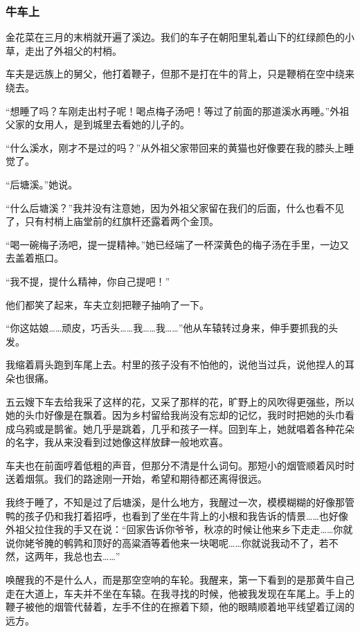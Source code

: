 \subsubsection{牛车上}

\par 金花菜在三月的末梢就开遍了溪边。我们的车子在朝阳里轧着山下的红绿颜色的小草，走出了外祖父的村梢。
\par 车夫是远族上的舅父，他打着鞭子，但那不是打在牛的背上，只是鞭梢在空中绕来绕去。
\par “想睡了吗？车刚走出村子呢！喝点梅子汤吧！等过了前面的那道溪水再睡。”外祖父家的女用人，是到城里去看她的儿子的。
\par “什么溪水，刚才不是过的吗？”从外祖父家带回来的黄猫也好像要在我的膝头上睡觉了。
\par “后塘溪。”她说。
\par “什么后塘溪？”我并没有注意她，因为外祖父家留在我们的后面，什么也看不见了，只有村梢上庙堂前的红旗杆还露着两个金顶。
\par “喝一碗梅子汤吧，提一提精神。”她已经端了一杯深黄色的梅子汤在手里，一边又去盖着瓶口。
\par “我不提，提什么精神，你自己提吧！”
\par 他们都笑了起来，车夫立刻把鞭子抽响了一下。
\par “你这姑娘……顽皮，巧舌头……我……我……”他从车辕转过身来，伸手要抓我的头发。
\par 我缩着肩头跑到车尾上去。村里的孩子没有不怕他的，说他当过兵，说他捏人的耳朵也很痛。
\par 五云嫂下车去给我采了这样的花，又采了那样的花，旷野上的风吹得更强些，所以她的头巾好像是在飘着。因为乡村留给我尚没有忘却的记忆，我时时把她的头巾看成乌鸦或是鹊雀。她几乎是跳着，几乎和孩子一样。回到车上，她就唱着各种花朵的名字，我从来没看到过她像这样放肆一般地欢喜。
\par 车夫也在前面哼着低粗的声音，但那分不清是什么词句。那短小的烟管顺着风时时送着烟氛。我们的路途刚一开始，希望和期待都还离得很远。
\par 我终于睡了，不知是过了后塘溪，是什么地方，我醒过一次，模模糊糊的好像那管鸭的孩子仍和我打着招呼，也看到了坐在牛背上的小根和我告诉的情景……也好像外祖父拉住我的手又在说：“回家告诉你爷爷，秋凉的时候让他来乡下走走……你就说你姥爷腌的鹌鹑和顶好的高粱酒等着他来一块喝呢……你就说我动不了，若不然，这两年，我总也去……”
\par 唤醒我的不是什么人，而是那空空响的车轮。我醒来，第一下看到的是那黄牛自己走在大道上，车夫并不坐在车辕。在我寻找的时候，他被我发现在车尾上。手上的鞭子被他的烟管代替着，左手不住的在擦着下颏，他的眼睛顺着地平线望着辽阔的远方。
